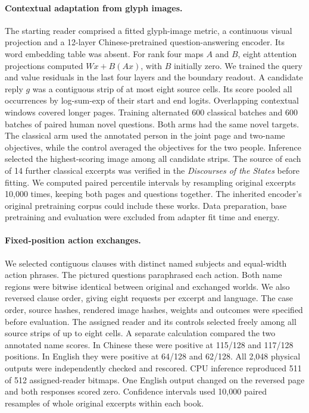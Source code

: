 \documentclass[12pt,a4paper]{article}
\providecommand{\DIFadd}[1]{{\protect\color{blue} \sf #1}} %
\begin{document}
\paragraph{\DIFadd{Contextual adaptation from glyph images.}}
\DIFadd{The starting reader comprised a fitted glyph-image metric, a continuous visual projection and a 12-layer Chinese-pretrained question-answering encoder. Its word embedding table was absent. For rank four maps $A$ and $B$, eight attention projections computed $Wx+B(Ax)$, with $B$ initially zero. We trained the query and value residuals in the last four layers and the boundary readout. A candidate reply $g$ was a contiguous strip of at most eight source cells. Its score pooled all occurrences by log-sum-exp of their start and end logits. Overlapping contextual windows covered longer pages. Training alternated 600 classical batches and 600 batches of paired human novel questions. Both arms had the same novel targets. The classical arm used the annotated person in the joint page and two-name objectives, while the control averaged the objectives for the two people. Inference selected the highest-scoring image among all candidate strips. The source of each of 14 further classical excerpts was verified in the \textit{Discourses of the States} before fitting. We computed paired percentile intervals by resampling original excerpts 10,000 times, keeping both pages and questions together. The inherited encoder's original pretraining corpus could include these works. Data preparation, base pretraining and evaluation were excluded from adapter fit time and energy.
}

\paragraph{\DIFadd{Fixed-position action exchanges.}}
\DIFadd{We selected contiguous clauses with distinct named subjects and equal-width action phrases. The pictured questions paraphrased each action. Both name regions were bitwise identical between original and exchanged worlds. We also reversed clause order, giving eight requests per excerpt and language. The case order, source hashes, rendered image hashes, weights and outcomes were specified before evaluation. The assigned reader and its controls selected freely among all source strips of up to eight cells. A separate calculation compared the two annotated name scores. In Chinese these were positive at 115/128 and 117/128 positions. In English they were positive at 64/128 and 62/128. All 2,048 physical outputs were independently checked and rescored. CPU inference reproduced 511 of 512 assigned-reader bitmaps. One English output changed on the reversed page and both responses scored zero. Confidence intervals used 10,000 paired resamples of whole original excerpts within each book.
}
\end{document}
